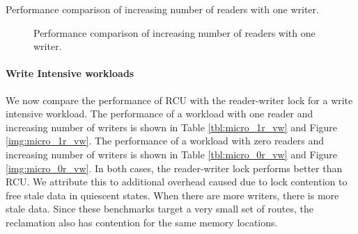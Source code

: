 \documentclass[a4paper,marginparwidth=50pt,marginparsep=10pt]{article}
\begin{document}
\begin{table}[tph]
\begin{center}

\end{center}
\label{tbl:micro_vr_1w}
\caption{Performance comparison of increasing number of readers with one writer.}
\end{table}

\begin{figure}[tph]
\begin{center}
\caption{Performance comparison of increasing number of readers with one writer.}
\label{img:micro_vr_1w}
\end{center}
\end{figure}

\paragraph{Write Intensive workloads}
We now compare the performance of RCU with the reader-writer lock for a write intensive workload. The performance of a workload with one reader and increasing number of writers is shown in Table \ref{tbl:micro_1r_vw} and Figure \ref{img:micro_1r_vw}. The performance of a workload with zero readers and increasing number of writers is shown in Table \ref{tbl:micro_0r_vw} and Figure \ref{img:micro_0r_vw}. In both cases, the reader-writer lock performs better than RCU. We attribute this to additional overhead caused due to lock contention to free stale data in quiescent states. When there are more writers, there is more stale data. Since these benchmarks target a very small set of routes, the reclamation also has contention for the same memory locations.
\end{document}
